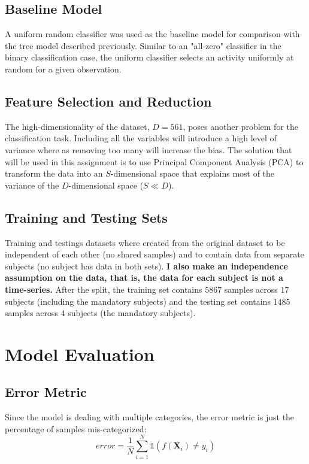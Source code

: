 \documentclass[paper=a4, fontsize=11pt]{scrartcl} %
\numberwithin{equation}{section} %
\numberwithin{figure}{section} %
\numberwithin{table}{section} %
\begin{document}
\subsection{Baseline Model}
A uniform random classifier was used as the baseline model for comparison 
with the tree model described previously. Similar to an "all-zero" 
classifier in the binary classification case, the uniform classifier 
selects an activity uniformly at random for a given observation.

\subsection{Feature Selection and Reduction}
The high-dimensionality of the dataset, $D = 561$, poses another problem
for the classification task. Including all the variables will introduce a 
high level of variance where as removing too many will increase the bias.
The solution that will be used in this assignment is to use Principal 
Component Analysis (PCA) to transform the data into an $S$-dimensional 
space that explains most of the variance of the $D$-dimensional space ($S  \ll D$). 

\subsection{Training and Testing Sets}
Training and testings datasets where created from the original dataset
to be independent of each other (no shared samples) and to contain data
from separate subjects (no subject has data in both sets). \textbf{I also make
an independence assumption on the data, that is, the data for each subject
is not a time-series.} After the split, the training set contains $5867$ 
samples across $17$ subjects (including the mandatory subjects) and the
testing set contains $1485$ samples across $4$ subjects (the mandatory
subjects).\\

\section{Model Evaluation}
\subsection{Error Metric}
Since the model is dealing with multiple categories, the error metric 
is just the percentage of samples mis-categorized:
$$error = \frac{1}{N}\sum_{i = 1}^N  \mathbb{1}\left(f(\mathbf{X}_i) \neq y_i \right) $$
\end{document}
